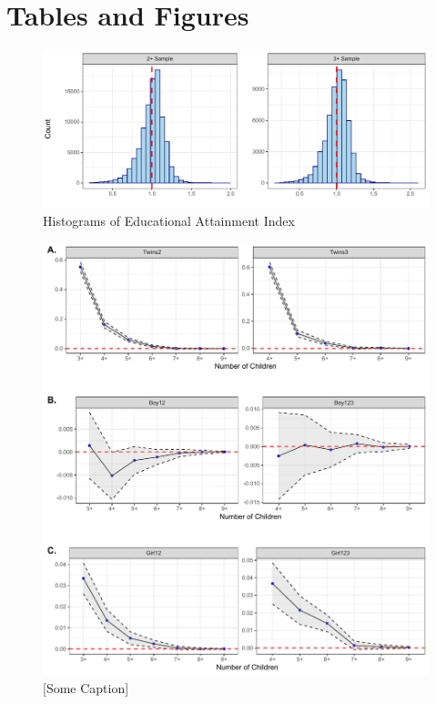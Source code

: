 \documentclass[11pt,a4paper]{article}
\begin{document}
\begin{onehalfspace}




\newpage
\printbibliography

\end{onehalfspace}

\newpage
\section*{Tables and Figures}

\begin{figure}[h!]
\centering
\caption{\label{fig:01}Histograms of Educational Attainment Index}
\includegraphics[width=\textwidth]{figures/hists.pdf}
\end{figure}

\begin{figure}[h!]
\centering
\caption{\label{fig:02}[Some Caption]}
\includegraphics[width=\textwidth]{figures/acrs.pdf}
\end{figure}
\end{document}
